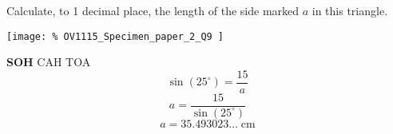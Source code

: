 \question Calculate, to 1 decimal place, 
the length of the side marked $a$ in this triangle.
\par
\begin{center}
	\texttt{[image: \%
		OV1115\_Specimen\_paper\_2\_Q9
	]}
\end{center}
\begin{solution}
	\textbf{SOH} CAH TOA
	\[
		\sin{(25^{\circ})} = \frac{15}{a}
	\]
	\[
		a = \frac{15}{\sin{(25^{\circ})}}
	\]
	\[
		a = 35.493023\ldots \; \text{cm}
	\]
\end{solution}

